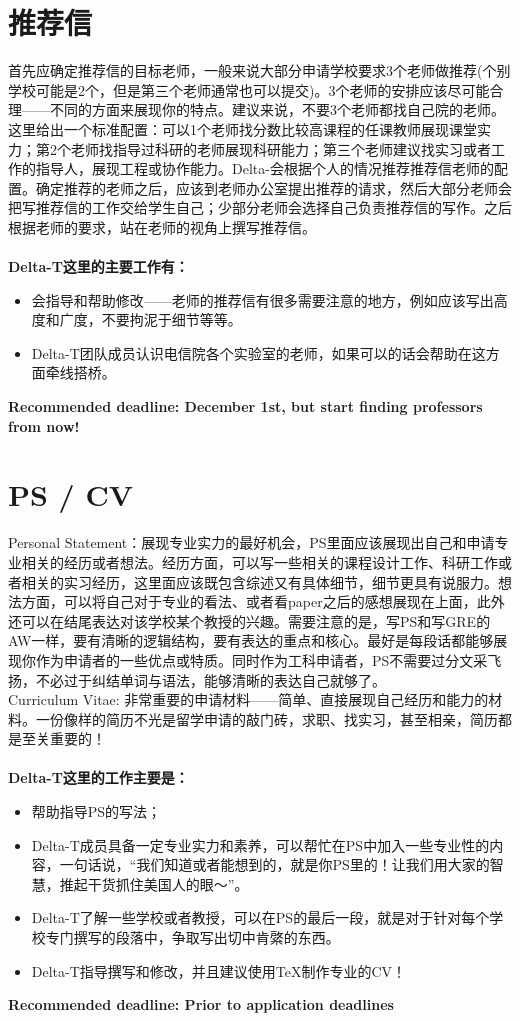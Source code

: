 \documentclass{article}
\begin{document}
\section{推荐信}
首先应确定推荐信的目标老师，一般来说大部分申请学校要求3个老师做推荐(个别学校可能是2个，但是第三个老师通常也可以提交)。3个老师的安排应该尽可能合理——不同的方面来展现你的特点。建议来说，不要3个老师都找自己院的老师。这里给出一个标准配置：可以1个老师找分数比较高课程的任课教师展现课堂实力；第2个老师找指导过科研的老师展现科研能力；第三个老师建议找实习或者工作的指导人，展现工程或协作能力。Delta-会根据个人的情况推荐推荐信老师的配置。确定推荐的老师之后，应该到老师办公室提出推荐的请求，然后大部分老师会把写推荐信的工作交给学生自己；少部分老师会选择自己负责推荐信的写作。之后根据老师的要求，站在老师的视角上撰写推荐信。\\
\\
\indent\textcolor{colorname2}{\bf Delta-T这里的主要工作有：}
\begin{itemize}
\item{会指导和帮助修改——老师的推荐信有很多需要注意的地方，例如应该写出高度和广度，不要拘泥于细节等等。}
\item{Delta-T团队成员认识电信院各个实验室的老师，如果可以的话会帮助在这方面牵线搭桥。}
\end{itemize}
\textbf{Recommended deadline: December 1st, but start finding professors from now!}

\section{PS / CV}
Personal Statement：展现专业实力的最好机会，PS里面应该展现出自己和申请专业相关的经历或者想法。经历方面，可以写一些相关的课程设计工作、科研工作或者相关的实习经历，这里面应该既包含综述又有具体细节，细节更具有说服力。想法方面，可以将自己对于专业的看法、或者看paper之后的感想展现在上面，此外还可以在结尾表达对该学校某个教授的兴趣。需要注意的是，写PS和写GRE的AW一样，要有清晰的逻辑结构，要有表达的重点和核心。最好是每段话都能够展现你作为申请者的一些优点或特质。同时作为工科申请者，PS不需要过分文采飞扬，不必过于纠结单词与语法，能够清晰的表达自己就够了。\\
\indent Curriculum Vitae: 非常重要的申请材料——简单、直接展现自己经历和能力的材料。一份像样的简历不光是留学申请的敲门砖，求职、找实习，甚至相亲，简历都是至关重要的！\\
\\
\indent\textcolor{colorname2}{\bf Delta-T这里的工作主要是：}
\begin{itemize}
\item{帮助指导PS的写法；}
\item{Delta-T成员具备一定专业实力和素养，可以帮忙在PS中加入一些专业性的内容，一句话说，“我们知道或者能想到的，就是你PS里的！让我们用大家的智慧，推起干货抓住美国人的眼～”。}
\item{Delta-T了解一些学校或者教授，可以在PS的最后一段，就是对于针对每个学校专门撰写的段落中，争取写出切中肯綮的东西。}
\item{Delta-T指导撰写和修改，并且建议使用TeX制作专业的CV！}
\end{itemize}
\textbf{Recommended deadline: Prior to application deadlines}
\end{document}
